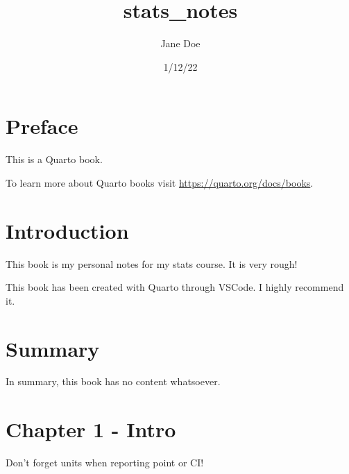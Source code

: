 \documentclass[
  letterpaper,
  DIV=11,
  numbers=noendperiod]{scrreprt}
\title{stats\_notes}
\author{Jane Doe}
\date{1/12/22}
\renewcommand*\contentsname{Table of contents}
\newcommand\contentsname{Table of contents}
\begin{document}
\maketitle
\ifdefined\Shaded\renewenvironment{Shaded}{\begin{tcolorbox}[boxrule=0pt, breakable, borderline west={3pt}{0pt}{shadecolor}, sharp corners, enhanced, frame hidden, interior hidden]}{\end{tcolorbox}}\fi

\renewcommand*\contentsname{Table of contents}
{
\hypersetup{linkcolor=}
\setcounter{tocdepth}{2}
\tableofcontents
}

\hypertarget{preface}{%
\chapter*{Preface}\label{preface}}


This is a Quarto book.

To learn more about Quarto books visit
\url{https://quarto.org/docs/books}.


\hypertarget{introduction}{%
\chapter{Introduction}\label{introduction}}

This book is my personal notes for my stats course. It is very rough!

This book has been created with Quarto through VSCode. I highly
recommend it.


\hypertarget{summary}{%
\chapter{Summary}\label{summary}}

In summary, this book has no content whatsoever.


\hypertarget{chapter-1---intro}{%
\chapter{Chapter 1 - Intro}\label{chapter-1---intro}}

Don't forget units when reporting point or CI!
\end{document}
